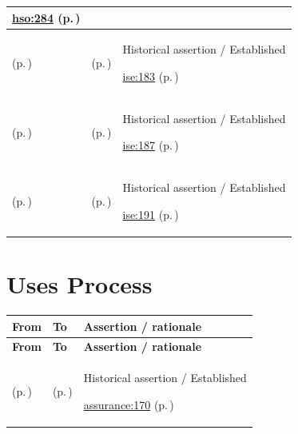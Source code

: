 \begin{longtable}{|>{\raggedright\arraybackslash}p{0.27\TableWidth}|>{\raggedright\arraybackslash}p{0.27\TableWidth}|>{\raggedright\arraybackslash}p{0.46\TableWidth}|}
 \hyperref[rad:hso:275]{hso:284} (p.\,\pageref{rad:hso:275})\\\hline
\nameref{function:coordinate-work-order} (p.\,\pageref{function:coordinate-work-order}) & \nameref{process:work-order-progression-process} (p.\,\pageref{process:work-order-progression-process}) & Historical assertion / Established

 \hyperref[rad:ise:171]{ise:183} (p.\,\pageref{rad:ise:171})\\\hline
\nameref{function:coordinate-to-do} (p.\,\pageref{function:coordinate-to-do}) & \nameref{process:to-do-progression-process} (p.\,\pageref{process:to-do-progression-process}) & Historical assertion / Established

 \hyperref[rad:ise:171]{ise:187} (p.\,\pageref{rad:ise:171})\\\hline
\nameref{function:coordinate-synthetic-task} (p.\,\pageref{function:coordinate-synthetic-task}) & \nameref{process:synthetic-task-progression-process} (p.\,\pageref{process:synthetic-task-progression-process}) & Historical assertion / Established

 \hyperref[rad:ise:171]{ise:191} (p.\,\pageref{rad:ise:171})\\\hline
\end{longtable}\endgroup
\section{Uses Process}
\begingroup\small\setlength{\TableWidth}{\dimexpr\linewidth-6\tabcolsep-4\arrayrulewidth\relax}
\begin{longtable}{|>{\raggedright\arraybackslash}p{0.27\TableWidth}|>{\raggedright\arraybackslash}p{0.27\TableWidth}|>{\raggedright\arraybackslash}p{0.46\TableWidth}|}
\hline\rowcolor{TableHead}\textbf{From} & \textbf{To} & \textbf{Assertion / rationale}\\\hline\endfirsthead
\hline\rowcolor{TableHead}\textbf{From} & \textbf{To} & \textbf{Assertion / rationale}\\\hline\endhead
\hline\endfoot
\nameref{service:request-service-assurance} (p.\,\pageref{service:request-service-assurance}) & \nameref{process:assurance-process-execution} (p.\,\pageref{process:assurance-process-execution}) & Historical assertion / Established

 \hyperref[rad:assurance:166]{assurance:170} (p.\,\pageref{rad:assurance:166})\\\hline
\end{longtable}\endgroup

